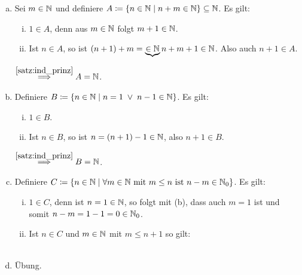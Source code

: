 \documentclass[../ana1.tex]{subfiles}
\begin{document}
\begin{bew}\leavevmode
	\begin{enumerate}[(a)]
		\item Sei \(m \in \mathbb{N}\) und definiere \(A \coloneqq \{n \in \mathbb{N} \; \vert \; n + m \in \mathbb{N}\} \subseteq \mathbb{N}\). Es gilt:
			  \begin{enumerate}[(i)]
				\item \(1 \in A\), denn aus \(m \in \mathbb{N}\) folgt \(m + 1 \in \mathbb{N}\).
				\item Ist \(n \in A\), so ist \((n + 1) + m = \underbrace{\in \mathbb{N}}{n + m} + 1 \in \mathbb{N}\).
					  Also auch \(n + 1 \in A\).
			  \end{enumerate}
			  \(\overset{\autoref{satz:ind_prinz}}{\implies} A = \N\).
		\item Definiere \(B \coloneqq \{n \in \mathbb{N} \; \vert \; n = 1 \; \vee \; n - 1 \in \mathbb{N}\}\). Es gilt:
			  \begin{enumerate}[(i)]
				\item \(1 \in B\).
				\item Ist \(n \in B\), so ist \(n = (n + 1) - 1 \in \mathbb{N}\), also \(n + 1 \in B\).
			  \end{enumerate}
			  \(\overset{\autoref{satz:ind_prinz}}{\implies} B = \N\).
		\item Definiere \(C \coloneqq \{n \in \mathbb{N} \; \vert \; \forall m \in \mathbb{N} \text{ mit } m \leq n \text{ ist } n - m \in \mathbb{N}_{0}\}\). Es gilt:
			  \begin{enumerate}[(i)]
				\item \(1 \in C\), denn ist \(n = 1 \in \mathbb{N}\), so folgt mit (b), dass auch \(m = 1\) ist und somit
					  \(n - m = 1 - 1 = 0 \in \mathbb{N}_{0}\).
				\item Ist \(n \in C\) und \(m \in \mathbb{N}\) mit \(m \leq n + 1\) so gilt:\\
					  \\
			  \end{enumerate}
		\item Übung.\qedhere
	\end{enumerate}
\end{bew}
\end{document}
